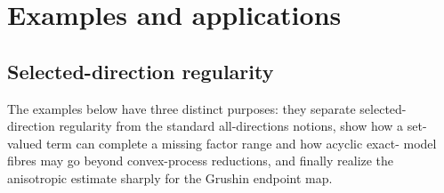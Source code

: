 \documentclass[11pt]{amsart}
\theoremstyle{definition}
\theoremstyle{remark}
\begin{document}
	\section{Examples and applications}
	\label{sec:examples}
	
	\subsection{Selected-direction regularity}
	
	The examples below have three distinct purposes: they separate selected-
	direction regularity from the standard all-directions notions, show how a
	set-valued term can complete a missing factor range and how acyclic exact-
	model fibres may go beyond convex-process reductions, and finally realize
	the anisotropic estimate sharply for the Grushin endpoint map.
	
\end{document}
